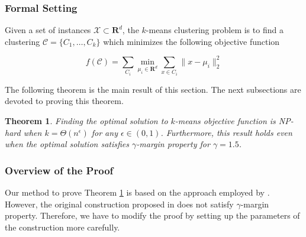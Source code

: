 \documentclass{article}
\newcommand{\mc}{\mathcal}
\newcommand{\mb}{\mathbf}
\newtheorem{theorem}{Theorem}
\begin{document}
\subsubsection{Formal Setting}

Given a set of instances $\mc X \subset \mb R ^d$, the $k$-means clustering problem is to find a clustering $\mc C = \{C_1, \ldots, C_k\}$ which minimizes the following objective function

$$f(\mc C) = \sum\limits_{C_i} \min\limits_{\mu_i\in {\mb R}^d}\sum\limits_{x\in C_i} \|x - \mu_i \|_2^2$$





The following theorem is the main result of this section. The next subsections are devoted to proving this theorem.

\begin{theorem}
\label{thm:gammaLower}
Finding the optimal solution to $k$-means objective function is NP-hard when $k=\Theta(n^\epsilon)$ for any $\epsilon \in (0,1)$. Furthermore, this result holds even when the optimal solution satisfies $\gamma$-margin property for $\gamma = 1.5$.


\end{theorem}

\subsubsection{Overview of the Proof}

Our method to prove Theorem \ref{thm:gammaLower} is based on the approach employed by \cite{vattani2009hardness}. However, the original construction proposed in \cite{vattani2009hardness} does not satisfy $\gamma$-margin property. Therefore, we have to modify the proof by setting up the parameters of the construction more carefully. 

\end{document}
